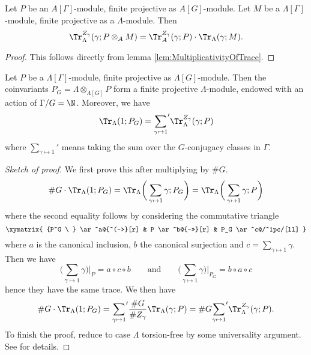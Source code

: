 \begin{lem} \label{lem:AWeakTraceFormula}
Let $P$ be an $A[\Gamma]$-module, finite projective as $A[G]$-module. Let $M$ be a $\Lambda[\Gamma]$-module, finite projective as a $\Lambda$-module. Then 
$$
\Tr_{\Lambda}^{Z_\gamma}(\gamma; P\otimes_A M) = \Tr_A^{Z_\gamma} (\gamma;P)\cdot \Tr_\Lambda(\gamma; M).
$$
\end{lem}

\begin{proof}
This follows directly from lemma \ref{lem:MultiplicativityOfTrace}.
\end{proof}

\begin{lem} \label{lem:TraceOf1}
Let $P$ be a $\Lambda[\Gamma]$-module, finite projective as $\Lambda[G]$-module. Then the coinvariants $P_G = \Lambda\otimes_{\Lambda[G]} P$
form a finite projective $\Lambda$-module, endowed with an action of $\Gamma/G = \N$. Moreover, we have
$$
\Tr_\Lambda(1; P_G) = {\sum_{\gamma\mapsto 1}}' \Tr_\Lambda^{Z_\gamma}(\gamma;P)
$$
where $\sum_{\gamma\mapsto 1}'$ means taking the sum over the $G$-conjugacy classes in $\Gamma$. 
\end{lem}

\begin{proof}[Sketch of proof] 
We first prove this after multiplying by $\#G$. 
$$
\# G\cdot \Tr_\Lambda(1; P_G)  
=  \Tr_\Lambda\bigg(\sum_{\gamma\mapsto 1} \gamma; P_G\bigg) 
=  \Tr_\Lambda\bigg(\sum_{\gamma\mapsto 1} \gamma; P\bigg)
$$
where the second equality follows by considering the commutative triangle 
$$
\xymatrix{
{P^G \ } \ar^a@{^(->}[r] & P \ar^b@{->>}[r] & P_G \ar^c@/^1pc/[ll]
}
$$
where $a$ is the canonical inclusion, $b$ the canonical surjection and $c = \sum_{\gamma \mapsto 1} \gamma$. Then we have
$$
\bigg(\sum_{\gamma \mapsto 1} \gamma\bigg) \bigg|_P = a \circ c \circ b 
\qquad \text{and} \qquad
\bigg(\sum_{\gamma \mapsto 1} \gamma\bigg) \bigg|_{P_G} = b \circ a \circ c 
$$
hence they have the same trace. We then have
$$
\# G\cdot \Tr_\Lambda(1; P_G)
 =
{\sum_{\gamma\mapsto 1}}' \frac{\# G}{\# Z_\gamma}\Tr_\Lambda(\gamma;P)
 =  \# G{\sum_{\gamma\mapsto 1}}' \Tr_\Lambda^{Z_\gamma}(\gamma; P).
$$
To finish the proof, reduce to case $\Lambda$ torsion-free by some universality argument. See \cite{SGA4.5} for details.
\end{proof}

